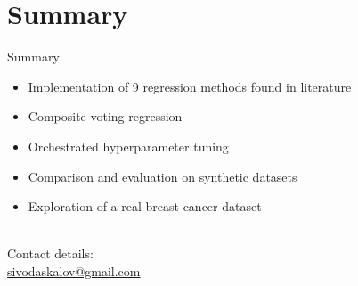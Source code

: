 \documentclass{beamer}
\begin{document}
\section{Summary}
\begin{frame}{Summary}
\begin{itemize}
	\item Implementation of 9 regression methods found in literature
	\item Composite voting regression
	\item Orchestrated hyperparameter tuning
	\item Comparison and evaluation on synthetic datasets
	\item Exploration of a real breast cancer dataset
\end{itemize}
~\\
Contact details:\\
\url{sivodaskalov@gmail.com}
\end{frame}
\end{document}
